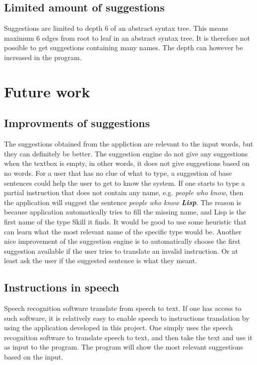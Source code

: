\subsection*{Limited amount of suggestions}
Suggestions are limited to depth 6 of an abstract syntax tree. This means maximum 6 edges from root to leaf in an abstract syntax tree. It is therefore not possible to get suggestions containing many names. The depth can however be increased in the program.

\section{Future work}
\subsection*{Improvments of suggestions}
The suggestions obtained from the appliction are relevant to the input words, but they can definitely be better. The suggestion engine do not give any suggestions when the textbox is empty, in other words, it does not give suggestions based on no words. For a user that has no clue of what to type, a suggestion of base sentences could help the user to get to know the system.
\newline
\newline
If one starts to type a partial instruction that does not contain any name, e.g. \emph{people who know}, then the application will suggest the sentence \emph{people who know \textbf{Lisp}}. The reason is because application automatically tries to fill the missing name, and Lisp is the first name of the type Skill it finds. It would be good to use some heuristic that can learn what the most relevant name of the specific type would be.
\newline
\newline
Another nice improvement of the suggestion engine is to automatically choose the first suggestion available if the user tries to translate an invalid instruction. Or at least ask the user if the suggested sentence is what they meant.

\subsection*{Instructions in speech}
Speech recognition software translate from speech to text. If one has access to such software, it is relatively easy to enable speech to instructions translation by using the application developed in this project. One simply uses the speech recognition software to translate speech to text, and then take the text and use it as input to the program. The program will show the most relevant suggestions based on the input.

